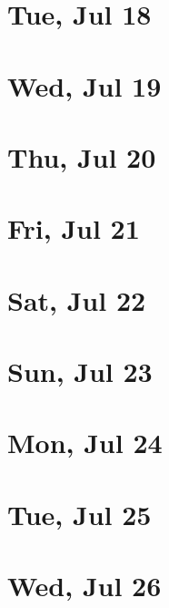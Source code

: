 	\section{Tue, Jul 18}
		
		
	\section{Wed, Jul 19}
		
		
	\section{Thu, Jul 20}
		
		
	\section{Fri, Jul 21}
		
		
	\section{Sat, Jul 22}
		
		
	\section{Sun, Jul 23}
		
		
	\section{Mon, Jul 24}
		
		
	\section{Tue, Jul 25}
		
		
	\section{Wed, Jul 26}
		
		
